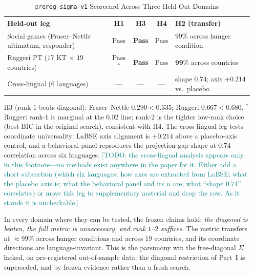 \documentclass[journal]{IEEEtran}
\newcommand{\rev}[1]{\textcolor{teal}{#1}}
\begin{document}
\begin{table}[!t]
\renewcommand{\arraystretch}{1.2}
\caption{\texttt{prereg-sigma-v1} Scorecard Across Three Held-Out Domains}
\label{tab:lowrank}
\centering
\begin{tabular}{@{}p{} c c c p{}@{}}
\toprule
\textbf{Held-out leg} & \textbf{H1} & \textbf{H3} & \textbf{H4} & \textbf{H2 (transfer)} \\
\midrule
Social games (Fraser--Nettle ultimatum, responder)~\cite{fraser2020} & Pass & \textbf{Pass} & Pass & $99\%$ across hunger condition \\
Ruggeri PT ($17$ KT $\times$ $19$ countries)~\cite{ruggeri2020} & Pass$^{*}$ & \textbf{Pass} & Pass & $\mathbf{99\%}$ across countries \\
Cross-lingual ($6$ languages) & --- & --- & --- & shape $0.74$; axis $+0.214$ vs.\ placebo \\
\bottomrule
\end{tabular}
\begin{flushleft}
\footnotesize{H3 (rank-$1$ beats diagonal): Fraser--Nettle $0.290<0.335$; Ruggeri $0.667<0.680$. $^{*}$Ruggeri rank-$1$ is marginal at the $0.02$ line; rank-$2$ is the tighter low-rank choice (best BIC in the original search), consistent with H4. The cross-lingual leg tests coordinate universality: LaBSE axis alignment is $+0.214$ above a placebo-axis control, and a behavioral panel reproduces the projection-gap shape at $0.74$ correlation across six languages. \rev{[TODO: the cross-lingual analysis appears only in this footnote---no methods exist anywhere in the paper for it. Either add a short subsection (which six languages; how axes are extracted from LaBSE; what the placebo axis is; what the behavioral panel and its $n$ are; what ``shape $0.74$'' correlates) or move this leg to supplementary material and drop the row. As it stands it is uncheckable.]}}
\end{flushleft}
\end{table}

In every domain where they can be tested, the frozen claims hold: \emph{the diagonal is beaten, the full metric is unnecessary, and rank $1$--$2$ suffices}.
The metric transfers at $\approx99\%$ across hunger conditions and across $19$ countries, and its coordinate directions are language-invariant.
This is the parsimony win the free-diagonal $\Sigma$ lacked, on pre-registered out-of-sample data; the diagonal restriction of Part~I is superseded, and by frozen evidence rather than a fresh search.
\end{document}

